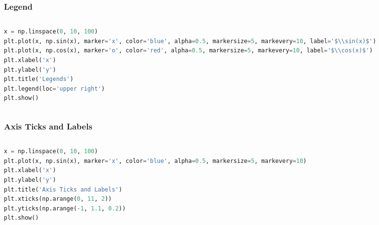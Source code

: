 \documentclass[beamer, en, version=2.0]{huangfusl-template}
\begin{document}
    \begin{frame}[fragile]
        \frametitle{Legend}

        \begin{columns}
        \begin{column}{0.5\textwidth}
\begin{lstlisting}[language=python, breaklines]
x = np.linspace(0, 10, 100)
plt.plot(x, np.sin(x), marker='x', color='blue', alpha=0.5, markersize=5, markevery=10, label='$\\sin(x)$')
plt.plot(x, np.cos(x), marker='o', color='red', alpha=0.5, markersize=5, markevery=10, label='$\\cos(x)$')
plt.xlabel('x')
plt.ylabel('y')
plt.title('Legends')
plt.legend(loc='upper right')
plt.show()
\end{lstlisting}
        \end{column}
        \begin{column}{0.5\textwidth}
            
        \end{column}
        \end{columns}

    \end{frame}
    \begin{frame}[fragile]
        \frametitle{Axis Ticks and Labels}

        \begin{columns}
        \begin{column}{0.5\textwidth}
\begin{lstlisting}[language=python, breaklines]
x = np.linspace(0, 10, 100)
plt.plot(x, np.sin(x), marker='x', color='blue', alpha=0.5, markersize=5, markevery=10)
plt.xlabel('x')
plt.ylabel('y')
plt.title('Axis Ticks and Labels')
plt.xticks(np.arange(0, 11, 2))
plt.yticks(np.arange(-1, 1.1, 0.2))
plt.show()
\end{lstlisting}
        \end{column}
        \begin{column}{0.5\textwidth}
            
        \end{column}
        \end{columns}
    \end{frame}
\end{document}
